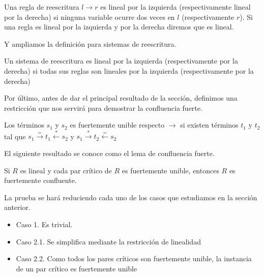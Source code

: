 \begin{defi}
  Una regla de reescritura $l \rightarrow r$ es lineal por la
  izquierda (respectivamente lineal por la derecha) si ninguna
  variable ocurre dos veces en $l$ (respectivamente $r$). Si una regla
  es lineal por la izquierda y por la derecha diremos que es lineal. 
\end{defi}

Y ampliamos la definición para sistemas de reescritura.

\begin{defi}
  Un sistema de reescritura es lineal por la izquierda
  (respectivamente por la derecha) si todas sus reglas son lineales por
  la izquierda (respectivamente por la derecha)
\end{defi}

Por último, antes de dar el principal resultado de la sección,
definimos una restricción que nos servirá para demostrar la
confluencia fuerte.

\begin{defi}
  Los términos $s_1$ y $s_2$ es fuertemente unible respecto
  $\rightarrow$ si existen términos $t_1$ y $t_2$ tal que
  $s_1 \xrightarrow{=} t_1 \xleftarrow{*} s_2$ y $s_1 \xrightarrow{*}
  t_2 \xleftarrow{=} s_2$
\end{defi}


El siguiente resultado se conoce como el lema de confluencia fuerte.

\begin{defi}
  Si $R$ es lineal y cada par crítico de $R$ es fuertemente unible,
  entonces $R$ es fuertemente confluente.
\end{defi}

\begin{demo}
  La prueba se hará reduciendo cada uno de los casos que estudiamos en
  la sección anterior.
  
  \begin{itemize}
    
  \item Caso 1. Es trivial.

  \item Caso 2.1. Se simplifica mediante la restricción de linealidad

  \item Caso 2.2. Como todos los pares críticos son fuertemente
    unible, la instancia de un par crítico es fuertemente unible

  \end{itemize}

\end{demo}

